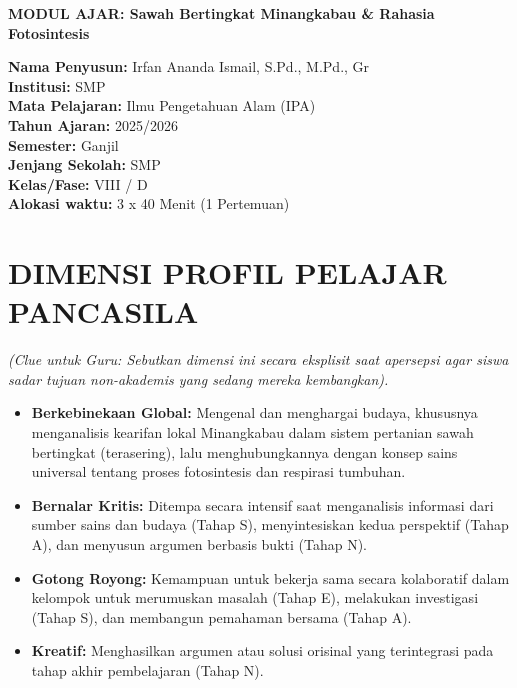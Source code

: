 \documentclass[a4paper,12pt]{article}
\begin{document}
\begin{center}
{\Large\textbf{MODUL AJAR: Sawah Bertingkat Minangkabau \& Rahasia Fotosintesis}}
\end{center}

\vspace{0.5cm}

\begin{tcolorbox}[mainbox]
\textbf{Nama Penyusun:} Irfan Ananda Ismail, S.Pd., M.Pd., Gr \\
\textbf{Institusi:} SMP \\
\textbf{Mata Pelajaran:} Ilmu Pengetahuan Alam (IPA) \\
\textbf{Tahun Ajaran:} 2025/2026 \\
\textbf{Semester:} Ganjil \\
\textbf{Jenjang Sekolah:} SMP \\
\textbf{Kelas/Fase:} VIII / D \\
\textbf{Alokasi waktu:} 3 x 40 Menit (1 Pertemuan)
\end{tcolorbox}

\section{DIMENSI PROFIL PELAJAR PANCASILA}
\textit{(Clue untuk Guru: Sebutkan dimensi ini secara eksplisit saat apersepsi agar siswa sadar tujuan non-akademis yang sedang mereka kembangkan).}

\begin{itemize}
\item \textbf{Berkebinekaan Global:} Mengenal dan menghargai budaya, khususnya menganalisis kearifan lokal Minangkabau dalam sistem pertanian sawah bertingkat (terasering), lalu menghubungkannya dengan konsep sains universal tentang proses fotosintesis dan respirasi tumbuhan.
\item \textbf{Bernalar Kritis:} Ditempa secara intensif saat menganalisis informasi dari sumber sains dan budaya (Tahap S), menyintesiskan kedua perspektif (Tahap A), dan menyusun argumen berbasis bukti (Tahap N).
\item \textbf{Gotong Royong:} Kemampuan untuk bekerja sama secara kolaboratif dalam kelompok untuk merumuskan masalah (Tahap E), melakukan investigasi (Tahap S), dan membangun pemahaman bersama (Tahap A).
\item \textbf{Kreatif:} Menghasilkan argumen atau solusi orisinal yang terintegrasi pada tahap akhir pembelajaran (Tahap N).
\end{itemize}
\end{document}
